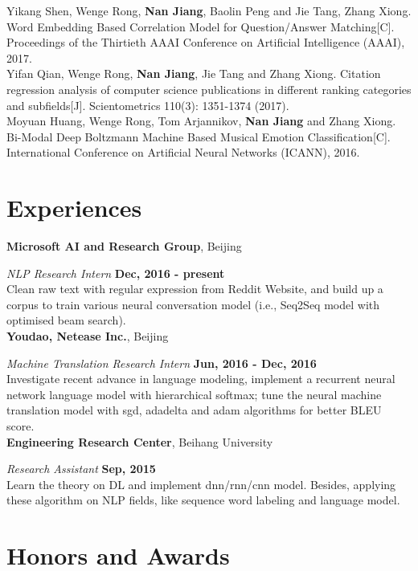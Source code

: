 \documentclass[margin,line]{resume}
\begin{document}
\begin{resume}
Yikang Shen, Wenge Rong, \textbf{Nan Jiang}, Baolin Peng and Jie Tang, Zhang Xiong. Word Embedding Based Correlation Model for Question/Answer Matching[C]. Proceedings of the Thirtieth {AAAI} Conference on Artificial Intelligence (AAAI), 2017.\\

Yifan Qian, Wenge Rong, \textbf{Nan Jiang}, Jie Tang and Zhang Xiong. Citation regression analysis of computer science publications in different ranking categories and subfields[J]. Scientometrics 110(3): 1351-1374 (2017).\\

Moyuan Huang, Wenge Rong, Tom Arjannikov, \textbf{Nan Jiang} and Zhang Xiong. Bi-Modal Deep Boltzmann Machine Based Musical Emotion Classification[C]. International Conference on Artificial Neural Networks (ICANN), 2016.



\section{Experiences}
{\bf Microsoft AI and Research Group}, Beijing

{\em NLP Research Intern} \hfill {\bf Dec, 2016 - present}\\
Clean raw text with regular expression from Reddit Website, and build up a corpus to train various neural conversation model (i.e., Seq2Seq model with optimised beam search).\\


{\bf Youdao, Netease Inc.}, Beijing

{\em Machine Translation Research Intern} \hfill {\bf Jun, 2016 - Dec, 2016}\\
Investigate recent advance in language modeling, implement a recurrent neural network language model with hierarchical softmax; tune the neural machine translation model with sgd, adadelta and adam algorithms for better BLEU score.\\


{\bf Engineering Research Center}, Beihang University

{\em Research Assistant} \hfill {\bf Sep, 2015 }\\
Learn the theory on DL and implement dnn/rnn/cnn model. Besides, applying these algorithm on NLP fields, like sequence word labeling and language model.



\section{Honors and Awards}


\end{resume}
\end{document}

